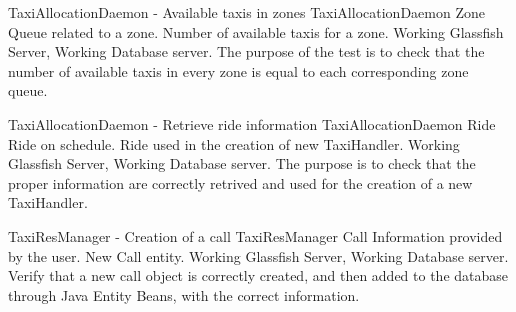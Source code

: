 \testx
{TaxiAllocationDaemon - Available taxis in zones}
{TaxiAllocationDaemon}
{Zone}
{Queue related to a zone.}
{Number of available taxis for a zone.}
{Working Glassfish Server, Working Database server.}
{The purpose of the test is to check that the number of available taxis in every
zone is equal to each corresponding zone queue.}

\testx
{TaxiAllocationDaemon - Retrieve ride information}
{TaxiAllocationDaemon}
{Ride}
{Ride on schedule.}
{Ride used in the creation of  new TaxiHandler.}
{Working Glassfish Server, Working Database server.}
{The purpose is to check that the proper information are correctly retrived and
used for the creation of a new TaxiHandler.}

\testx
{TaxiResManager - Creation of a call}
{TaxiResManager}
{Call}
{Information provided by the user.}
{New Call entity.}
{Working Glassfish Server, Working Database server.}
{Verify that a new call object is correctly created, and then added to the database
through Java Entity Beans, with the correct information.}
